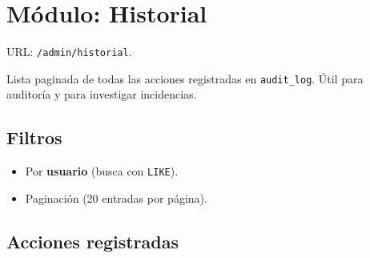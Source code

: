 \documentclass[11pt,a4paper]{article}
\begin{document}
\section{Módulo: Historial}

URL: \texttt{/admin/historial}.

Lista paginada de todas las acciones registradas en \texttt{audit\_log}.
Útil para auditoría y para investigar incidencias.

\subsection{Filtros}
\begin{itemize}[leftmargin=*]
    \item Por \textbf{usuario} (busca con \texttt{LIKE}).
    \item Paginación (20 entradas por página).
\end{itemize}

\subsection{Acciones registradas}
\end{document}
